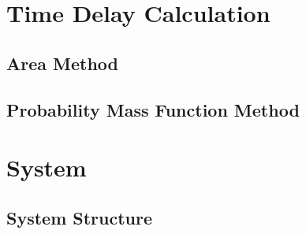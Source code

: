 \documentclass[a4paper,11pt]{article}
\begin{document}
\section{Time Delay Calculation}
\label{sec-5}
\subsection{Area Method}
\label{sec-5-1}
\subsection{Probability Mass Function Method}
\label{sec-5-2}
\section{System}
\label{sec-6}
\subsection{System Structure}
\label{sec-6-1}
\end{document}
